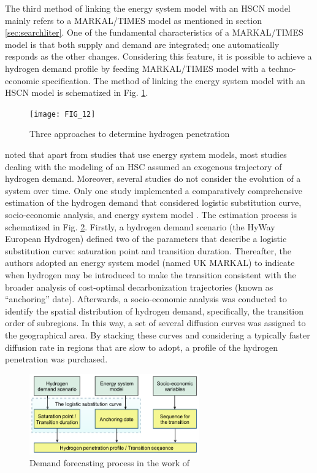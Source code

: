 \documentclass[11pt,3p]{elsarticle}
\begin{document}
The third method of linking the energy system model with an HSCN model mainly refers to a MARKAL/TIMES model as mentioned in section \ref{sec:searchliter}. One of the fundamental characteristics of a MARKAL/TIMES model is that both supply and demand  are integrated; one automatically responds as the other changes. Considering this feature, it is possible to achieve a hydrogen demand profile by feeding MARKAL/TIMES model with a techno-economic specification. The method of linking the energy system model with an HSCN model is schematized in Fig. \ref{fig:ApproachHydrogenPenetration}. 

\begin{figure}[!htbp]
\centering
\texttt{[image: FIG\_12]}
\caption{\label{fig:ApproachHydrogenPenetration}Three approaches to determine hydrogen penetration}
\end{figure}

\citet{agnolucci2013designing} noted that apart from studies that use energy system models, most studies dealing with the modeling of an HSC assumed an exogenous trajectory of hydrogen demand. Moreover, several studies do not consider the evolution of a system over time. Only one study implemented a comparatively comprehensive estimation of the hydrogen demand that considered logistic substitution curve, socio-economic analysis, and energy system model \citep{agnolucci2013importance}. The estimation process is schematized in Fig. \ref{fig:DemandForecastingAgnolucci}. Firstly, a hydrogen demand scenario (the HyWay European Hydrogen) \citep{EU2008hyways} defined two of the parameters that describe a logistic substitution curve: saturation point and transition duration. Thereafter, the authors adopted an energy system model (named UK MARKAL) to indicate when hydrogen may be introduced to make the transition consistent with the broader analysis of cost-optimal decarbonization trajectories (known as ``anchoring'' date). Afterwards, a socio-economic analysis was conducted to identify the spatial distribution of hydrogen demand, specifically, the transition order of subregions. In this way, a set of several diffusion curves was assigned to the geographical area. By stacking these curves and considering a typically faster diffusion rate in regions that are slow to adopt, a profile of the hydrogen penetration was purchased.

\begin{figure}[!htbp]
\centering
\includegraphics[width=0.65\textwidth]{FIG_13}
\caption{\label{fig:DemandForecastingAgnolucci}Demand forecasting process in the work of \citet{agnolucci2013importance}}
\end{figure}
\end{document}
